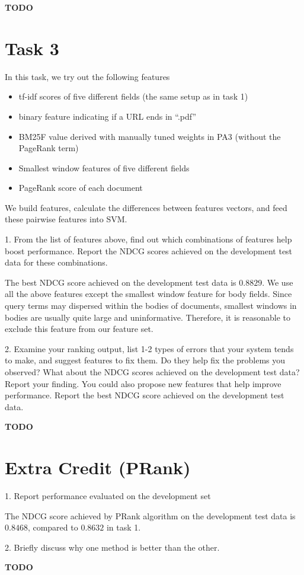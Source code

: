 \textbf{TODO}

\section{Task 3}
In this task, we try out the following features
\begin{itemize}
  \item[] tf-idf scores of five different fields (the same setup as in task 1)
  \item[] binary feature indicating if a URL ends in ``.pdf''
  \item[] BM25F value derived with manually tuned weights in PA3 (without the PageRank term)
  \item[] Smallest window features of five different fields
  \item[] PageRank score of each document
\end{itemize}
We build features, calculate the differences between features vectors, and feed these pairwise features into SVM.

1. From the list of features above, find out which combinations of features help boost
performance. Report the NDCG scores achieved on the development test data
for these combinations.

The best NDCG score achieved on the development test data is $0.8829$.
We use all the above features except the smallest window feature for body fields.
Since query terms may dispersed within the bodies of documents, smallest windows in bodies are usually quite large and uninformative. Therefore, it is reasonable to exclude this feature from our feature set.  

2.
Examine your ranking output, list 1-2 types of errors that your system tends
to make, and suggest features to fix them. Do they help fix the problems you
observed? What about the NDCG scores achieved on the development test data?
Report your finding.
You could also propose new features that help improve performance. Report the
best NDCG score achieved on the development test data.

\textbf{TODO}


\section{Extra Credit (PRank)}

1. Report performance evaluated on the development set

The NDCG score achieved by PRank algorithm on the development test data is $0.8468$, compared to $0.8632$ in task 1.

2. Briefly discuss why one method is better than the other.

\textbf{TODO}


